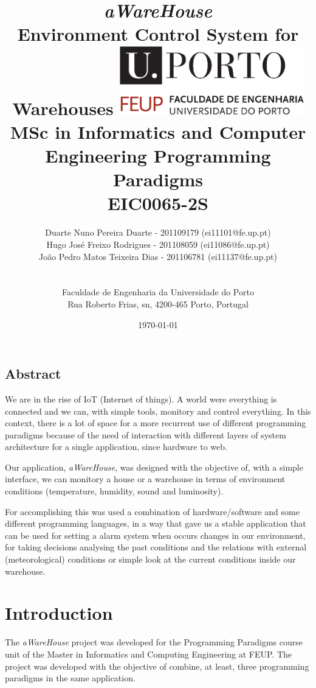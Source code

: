 \documentclass[12pt]{report}
\title{
\huge{\textbf{\textit{aWareHouse}}}\linebreak
\Large\textbf{\\Environment Control System for Warehouses}\linebreak\linebreak\linebreak
\includegraphics[width=8cm]{feup.pdf}\linebreak \linebreak
\large{MSc in Informatics and Computer Engineering} \linebreak
\large{Programming Paradigms \\ EIC0065-2S}\linebreak
}
\author{
Duarte Nuno Pereira Duarte - 201109179 (ei11101@fe.up.pt)\\
Hugo José Freixo Rodrigues - 201108059 (ei11086@fe.up.pt)\\
João Pedro Matos Teixeira Dias - 201106781 (ei11137@fe.up.pt)\\
\\
\\ Faculdade de Engenharia da Universidade do Porto \\ Rua Roberto Frias, s\/n, 4200-465 Porto, Portugal
}
\date{\today}
\begin{document}
\maketitle


\newpage
\section*{Abstract}

We are in the rise of IoT (Internet of things). A world were everything is connected and we can, with simple tools, monitory and control everything. In this context, there is a lot of space for a more recurrent use of different programming paradigms because of the need of interaction with different layers of system architecture for a single application, since hardware to web.

Our application, \textit{aWareHouse}, was designed with the objective of, with a simple interface, we can monitory a house or a warehouse in terms of environment conditions (temperature, humidity, sound and luminosity). 

For accomplishing this was used a combination of hardware/software and some different programming languages, in a way that gave us a stable application that can be used for setting a alarm system when occurs changes in our environment, for taking decisions analysing the past conditions and the relations with external (meteorological) conditions or simple look at the current conditions inside our warehouse.


\newpage
\tableofcontents
\newpage

\chapter{Introduction}

The \textit{aWareHouse} project was developed for the Programming Paradigms course unit of the Master in Informatics and Computing Engineering at FEUP. The project was developed with the objective of combine, at least, three programming paradigms in the same application.
\end{document}
